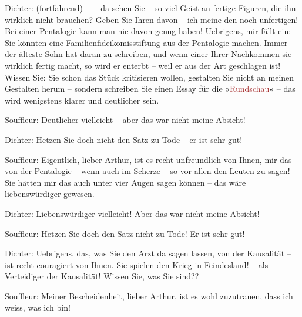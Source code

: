 \pstart
           Dichter: (fortfahrend) – – da sehen Sie – so viel Geist an fertige Figuren, die ihn
               wirklich nicht brauchen? Geben Sie Ihren davon – ich meine den noch unfertigen! Bei
               einer Pentalogie kann man nie davon genug haben! Uebrigens, mir fällt ein: Sie
               könnten eine Familienfideikomisstiftung aus der Pentalogie machen. Immer der älteste Sohn hat daran zu schreiben, und wenn einer
               Ihrer Nachkommen sie wirklich fertig macht, so wird{ }{\pb}er enterbt – weil er aus der Art
               geschlagen ist! Wissen Sie:  Sie schon das Stück
               kritisieren wollen, gestalten Sie nicht an meinen Gestalten herum – sondern schreiben
               Sie einen Essay für die »\textcolor{brown}{Rundschau}{}\ledrightnote{\textcolor{brown}{Neue Rundschau, Neue Deutsche Rundschau, Freie Bühne}}« – das wird
               wenigstens klarer und deutlicher sein.\pend
           
\pstart
           Souffleur: Deutlicher vielleicht – aber das war nicht meine Absicht!\pend
           
\pstart
           Dichter: Hetzen Sie doch nicht den Satz zu Tode – er ist sehr gut!\pend
           
\pstart
           Souffleur: Eigentlich, lieber Arthur, ist es recht unfreundlich von Ihnen, mir das
               von der Pentalogie – wenn auch im Scherze – so vor allen den Leuten zu sagen! Sie
               hätten mir das auch unter vier Augen sagen können – das wäre liebenswürdiger
               gewesen.\pend
           
\pstart
           Dichter: Liebenswürdiger vielleicht! Aber das war nicht meine Absicht!\pend
           
\pstart
           Souffleur: Hetzen Sie doch den Satz nicht zu Tode! Er ist sehr gut!\pend
           
\pstart
           Dichter: Uebrigens, das, was Sie den Arzt da sagen lassen, von der Kausalität – ist
               recht couragiert von Ihnen. Sie spielen den Krieg in Feindesland!  – als Verteidiger der Kausalität! Wissen Sie, was Sie
               sind??\pend
           
\pstart
           Souffleur: Meiner Bescheiden\introOben{}heit\introOben{}, lieber Arthur, ist es wohl
               zuzutrauen, dass ich weiss, was ich bin!\pend
           
